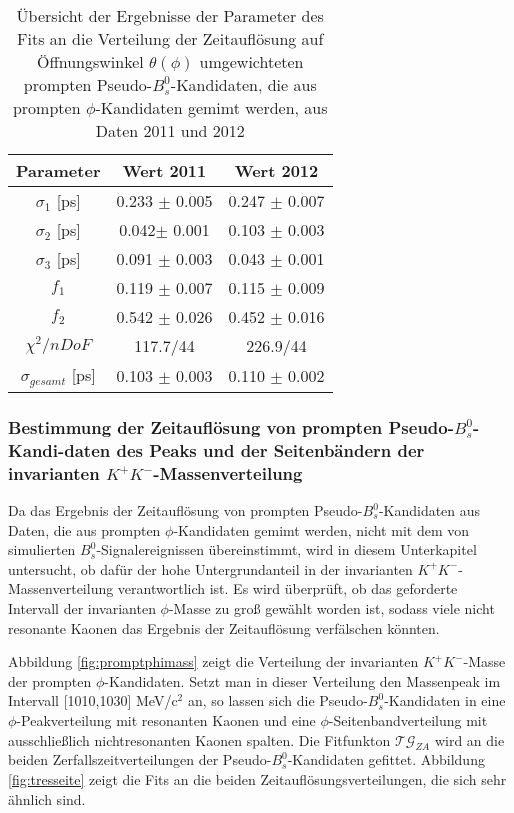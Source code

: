 \documentclass{article}
\begin{document}
\begin{table}[h!]
\noindent \begin{centering}
\begin{tabular}{c|c|c}
Parameter&Wert 2011&Wert 2012\tabularnewline
\hline 
$\sigma_1$ [ps] & 0.233 $\pm$ 0.005 & 0.247 $\pm$ 0.007 \tabularnewline
$\sigma_2$ [ps]& 0.042$\pm$ 0.001  & 0.103 $\pm$ 0.003 \tabularnewline
$\sigma_3$ [ps]& 0.091 $\pm$ 0.003 & 0.043 $\pm$ 0.001 \tabularnewline
$f_1$ & 0.119 $\pm$ 0.007 & 0.115 $\pm$ 0.009   \tabularnewline
$f_2$ & 0.542 $\pm$ 0.026 & 0.452 $\pm$ 0.016 \tabularnewline
\hline
$\chi^2/nDoF$ & 117.7/44 & 226.9/44\tabularnewline
\hline
$\sigma_{gesamt}$ [ps]&0.103 $\pm$ 0.003&0.110 $\pm$ 0.002 \tabularnewline
\end{tabular}
\par \end{centering}
\caption{Übersicht der Ergebnisse der Parameter des Fits an die Verteilung der Zeitauflösung auf Öffnungswinkel $\theta(\phi)$ umgewichteten prompten Pseudo-$B_s^0$-Kandidaten, die aus prompten $\phi$-Kandidaten gemimt werden, aus Daten 2011 und 2012}
\label{table:fitpromptdatare}
\end{table}


\subsubsection[Bestimmung der Zeitauflösung von prompten Pseudo-$B_s^0$-Kandidaten des Peaks und der Seitenbändern der invarianten $K^+K^-$-Massenverteilung]{Bestimmung der Zeitauflösung von prompten Pseudo-$B_s^0$-Kandi-daten des Peaks und der Seitenbändern der invarianten $K^+K^-$-Massenverteilung}
\label{ch:seitenband}
Da das Ergebnis der Zeitauflösung von prompten Pseudo-$B_s^0$-Kandidaten aus Daten, die aus prompten $\phi$-Kandidaten gemimt werden, nicht mit dem von simulierten $B_s^0$-Signalereignissen übereinstimmt, wird in diesem Unterkapitel untersucht, ob dafür der hohe Untergrundanteil in der invarianten $K^+K^-$-Massenverteilung verantwortlich ist. Es wird überprüft, ob das geforderte Intervall der invarianten $\phi$-Masse zu groß gewählt worden ist, sodass viele nicht resonante Kaonen das Ergebnis der Zeitauflösung verfälschen könnten.

Abbildung \ref{fig:promptphimass} zeigt die Verteilung der invarianten $K^+K^-$-Masse der prompten $\phi$-Kandidaten. Setzt man in dieser Verteilung den Massenpeak im Intervall [1010,1030] MeV/c$^2$ an, so lassen sich die Pseudo-$B_s^0$-Kandidaten in eine $\phi$-Peakverteilung mit resonanten Kaonen und eine $\phi$-Seitenbandverteilung mit ausschließlich nichtresonanten Kaonen spalten. Die Fitfunkton $\mathcal{TG}_{ZA}$ wird an die beiden Zerfallszeitverteilungen der Pseudo-$B_s^0$-Kandidaten gefittet. %
Abbildung \ref{fig:tresseite} zeigt die Fits an die beiden Zeitauflösungsverteilungen, die sich sehr ähnlich sind. 
\end{document}
